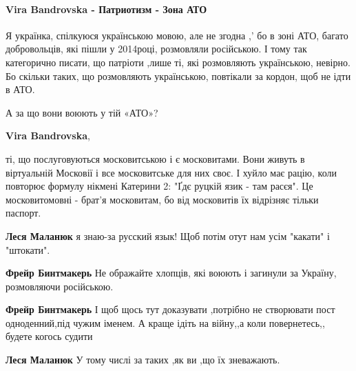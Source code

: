  
 
 
 
 

\paragraph{Vira Bandrovska - Патриотизм - Зона АТО}
\label{sec:12_10_2019.fb.malanjuk_lesja.1.patriotizm_imja_jazyk.cmt.2.bandrovska_ato}

\begin{itemize} %

Я українка, спілкуюся українською мовою, але не згодна ,' бо в зоні АТО, багато
добровольців, які пішли у 2014році, розмовляли російською. І тому так категорично
писати, що патріоти ,лише ті, які розмовляють українською, невірно. Бо скільки
таких, що розмовляють українською, повтікали за кордон, щоб не ідти в АТО.

\begin{itemize} %
А за що вони воюють у тій «АТО»?

\textbf{Vira Bandrovska}, 

ті, що послуговуються московитською і є московитами. Вони живуть в віртуальній
Московії і все московитське для них своє. І хуйло має рацію, коли повторює
формулу нікмені Катерини 2: "Ґдє руцкій язик - там расєя". Це московитомовні -
брат'я московитам, бо від московитів їх відрізняє тільки паспорт.

\textbf{Леся Маланюк} я знаю-за русский язык! Щоб потім отут нам усім "какати" і "штокати".

\textbf{Фрейр Бинтмакерь} Не ображайте хлопців, які воюють і загинули за Україну, розмовляючи російською.

\textbf{Фрейр Бинтмакерь} І щоб щось тут доказувати ,потрібно не створювати пост одноденний,під чужим іменем. А краще ідіть на війну,,а коли повернетесь,, будете когось судити

\textbf{Леся Маланюк} У тому числі за таких ,як ви ,що їх зневажають.


\end{itemize}
\end{itemize}

